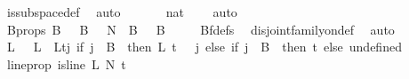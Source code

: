 \begin{isabellebody}
\ is{\isacharunderscore}{\kern0pt}subspace{\isacharunderscore}{\kern0pt}def\ \isamarkupfalse%
\ auto\ \isanewline
\isanewline
\ \ \ \ \isamarkupfalse%
\ {\isachardoublequoteopen}{\isacharbraceleft}{\kern0pt}{\isachardot}{\kern0pt}{\isachardot}{\kern0pt}{}{\isacharcolon}{\kern0pt}{\isacharcolon}{\kern0pt}nat{\isacharbraceright}{\kern0pt}\ {\isacharequal}{\kern0pt}\ {\isacharbraceleft}{\kern0pt}{}{\isacharcomma}{\kern0pt}{}{\isacharbraceright}{\kern0pt}{\isachardoublequoteclose}\ \isamarkupfalse%
\ auto\isanewline
\ \ \ \ \isamarkupfalse%
\ \isamarkupfalse%
\ B{\isacharunderscore}{\kern0pt}props{\isacharcolon}{\kern0pt}\ {\isachardoublequoteopen}B\ {}\ {\isasymunion}\ B\ {}\ {\isacharequal}{\kern0pt}\ {\isacharbraceleft}{\kern0pt}{\isachardot}{\kern0pt}{\isachardot}{\kern0pt}{\isacharless}{\kern0pt}N{\isacharprime}{\kern0pt}{\isacharbraceright}{\kern0pt}\ {\isasymand}\ {\isacharparenleft}{\kern0pt}B\ {}\ {\isasyminter}\ B\ {}\ {\isacharequal}{\kern0pt}\ {\isacharbraceleft}{\kern0pt}{\isacharbraceright}{\kern0pt}{\isacharparenright}{\kern0pt}{\isachardoublequoteclose}\ \isamarkupfalse%
\ Bf{\isacharunderscore}{\kern0pt}defs\ \isamarkupfalse%
\ disjoint{\isacharunderscore}{\kern0pt}family{\isacharunderscore}{\kern0pt}on{\isacharunderscore}{\kern0pt}def\ \isamarkupfalse%
\ auto\isanewline
\ \ \ \ \isamarkupfalse%
\ L{\isacharprime}{\kern0pt}\ \ \ {\isachardoublequoteopen}L{\isacharprime}{\kern0pt}\ {\isasymequiv}\ L{\isacharparenleft}{\kern0pt}t{\isacharcolon}{\kern0pt}{\isacharequal}{\kern0pt}{\isacharparenleft}{\kern0pt}{\isasymlambda}j{\isachardot}{\kern0pt}\ if\ j\ {\isasymin}\ B\ {}\ then\ L\ {\isacharparenleft}{\kern0pt}t\ {\isacharminus}{\kern0pt}\ {}{\isacharparenright}{\kern0pt}\ j\ else\ {\isacharparenleft}{\kern0pt}if\ j\ {\isasymin}\ B\ {}\ then\ t\ else\ undefined{\isacharparenright}{\kern0pt}{\isacharparenright}{\kern0pt}{\isacharparenright}{\kern0pt}{\isachardoublequoteclose}\ \isanewline
\ \ \ \ \isamarkupfalse%
\ line{\isacharunderscore}{\kern0pt}prop{\isacharcolon}{\kern0pt}\ {\isachardoublequoteopen}is{\isacharunderscore}{\kern0pt}line\ L{\isacharprime}{\kern0pt}\ N{\isacharprime}{\kern0pt}\ {\isacharparenleft}{\kern0pt}t\ {\isacharplus}{\kern0pt}\ {}{\isacharparenright}{\kern0pt}{\isachardoublequoteclose}\isanewline
\ \ \ \ \isamarkupfalse%

\end{isabellebody}
